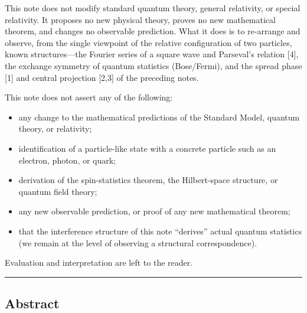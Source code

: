 \documentclass[
]{article}
\providecommand{\tightlist}{%
  \setlength{\itemsep}{0pt}\setlength{\parskip}{0pt}}
\begin{document}
This note does not modify standard quantum theory, general relativity,
or special relativity. It proposes no new physical theory, proves no new
mathematical theorem, and changes no observable prediction. What it does
is to re-arrange and observe, from the single viewpoint of the relative
configuration of two particles, known structures---the Fourier series of
a square wave and Parseval's relation {[}4{]}, the exchange symmetry of
quantum statistics (Bose/Fermi), and the spread phase {[}1{]} and
central projection {[}2,3{]} of the preceding notes.

This note does not assert any of the following:

\begin{itemize}
\tightlist
\item
  any change to the mathematical predictions of the Standard Model,
  quantum theory, or relativity;
\item
  identification of a particle-like state with a concrete particle such
  as an electron, photon, or quark;
\item
  derivation of the spin-statistics theorem, the Hilbert-space
  structure, or quantum field theory;
\item
  any new observable prediction, or proof of any new mathematical
  theorem;
\item
  that the interference structure of this note ``derives'' actual
  quantum statistics (we remain at the level of observing a structural
  correspondence).
\end{itemize}

Evaluation and interpretation are left to the reader.

\begin{center}\rule{0.5\linewidth}{0.5pt}\end{center}

\subsection{Abstract}\label{abstract}
\end{document}
